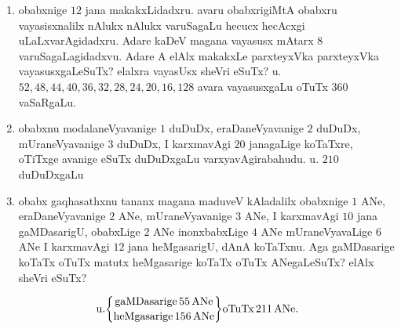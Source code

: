 \begin{enumerate}[\rm (1)]
\item obabxnige $12$ jana makakxLidadxru. avaru obabxrigiMtA obabxru vayasisxnalilx nAlukx nAlukx varuSagaLu hecucx hecAcxgi uLaLxvarAgidadxru. Adare kaDeV magana vayasusx mAtarx 8 varuSagaLagidadxvu. Adare A elAlx makakxLe parxteyxVka parxteyxVka vayasusxgaLeSuTx? elalxra vayasUsx sheVri eSuTx? u. $52, 48, 44, 40, 36, 32, 28, 24, 20, 16, 128$ avara vayasusxgaLu oTuTx $360$ vaSaRgaLu.

\item obabxnu modalaneVyavanige $1$ duDuDx, eraDaneVyavanige $2$ duDuDx, mUraneVyavanige $3$ duDuDx, I karxmavAgi $20$ janagaLige koTaTxre, oTiTxge avanige eSuTx duDuDxgaLu varxyavAgirabahudu. u. $210$ duDuDxgaLu

\item obabx gaqhasathxnu tananx magana maduveV kAladalilx obabxnige $1$ ANe, eraDaneVyavanige $2$ ANe, mUraneVyavanige $3$ ANe, I karxmavAgi $10$ jana gaMDasarigU, obabxLige $2$ ANe inonxbabxLige $4$ ANe mUraneVyavaLige $6$ ANe I karxmavAgi $12$ jana heMgasarigU, dAnA koTaTxnu. Aga gaMDasarige koTaTx oTuTx matutx heMgasarige koTaTx oTuTx ANegaLeSuTx? elAlx sheVri eSuTx?
\end{enumerate}

\begin{equation*}
\text{u.}\chssk{\text{gaMDasarige}\, 55 \,\text{ANe}}{\text{heMgasarige}\, 156 \,\text{ANe}} \text{oTuTx}\, 211 \,\text{ANe}.
\end{equation*}
